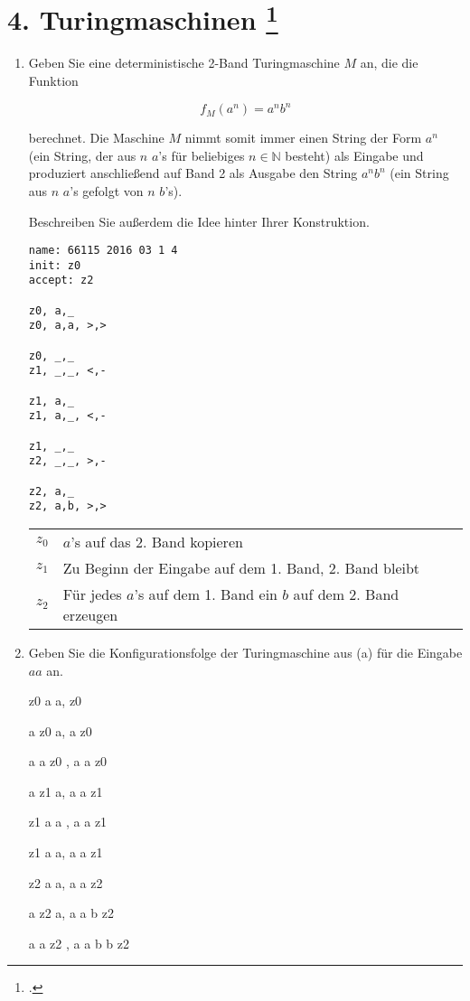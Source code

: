 \documentclass{lehramt-informatik-aufgabe}
\begin{document}
\let\l=\liTuringLeerzeichen

\liAufgabenTitel{}
\section{4. Turingmaschinen
\footcite{66115:2016:03}}

\begin{enumerate}


\item Geben Sie eine deterministische 2-Band Turingmaschine $M$ an, die
die Funktion

\begin{displaymath}
f_M(a^n) = a^n b^n
\end{displaymath}

berechnet. Die Maschine $M$ nimmt somit immer einen String der Form
$a^n$ (ein String, der aus $n$ $a$’s für beliebiges $n \in \mathbb{N}$
besteht) als Eingabe und produziert anschließend auf Band 2 als Ausgabe
den String $a^n b^n$ (ein String aus $n$ $a$’s gefolgt von $n$ $b$’s).

Beschreiben Sie außerdem die Idee hinter Ihrer Konstruktion.

\begin{liAntwort}
\begin{verbatim}
name: 66115 2016 03 1 4
init: z0
accept: z2

z0, a,_
z0, a,a, >,>

z0, _,_
z1, _,_, <,-

z1, a,_
z1, a,_, <,-

z1, _,_
z2, _,_, >,-

z2, a,_
z2, a,b, >,>
\end{verbatim}

\begin{tabular}{c|l}
$z_0$ & $a$’s auf das 2. Band kopieren \\
$z_1$ & Zu Beginn der Eingabe auf dem 1. Band, 2. Band bleibt\\
$z_2$ & Für jedes $a$’s auf dem 1. Band ein $b$ auf dem 2. Band erzeugen\\
\end{tabular}
\end{liAntwort}

\item Geben Sie die Konfigurationsfolge der Turingmaschine aus (a) für
die Eingabe $aa$ an.

\begin{liAntwort}
z0 a a,
z0 \l \l

a z0 a,
a z0 \l

a a z0 \l,
a a z0 \l

a z1 a,
a a z1 \l

z1 a a \l,
a a z1 \l

z1 \l a a,
a a z1 \l

z2 a a,
a a z2 \l

a z2 a,
a a b z2 \l

a a z2 \l,
a a b b z2 \l
\end{liAntwort}

\end{enumerate}
\end{document}
